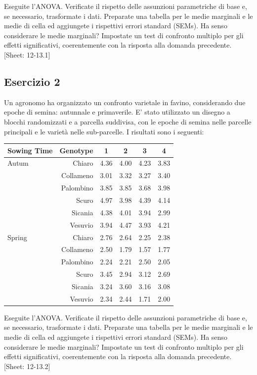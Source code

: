 \documentclass[a4paper,12pt,oneside]{book}
\begin{document}
Eseguite l'ANOVA. Verificate il rispetto delle assunzioni parametriche di base e, se necessario, trasformate i dati. Preparate una tabella per le medie marginali e le medie di cella ed aggiungete i rispettivi errori standard (SEMs). Ha senso considerare le medie marginali? Impostate un test di confronto multiplo per gli effetti significativi, coerentemente con la risposta alla domanda precedente.
{[}Sheet: 12-13.1{]}

\hypertarget{esercizio-2-8}{%
\subsection{Esercizio 2}\label{esercizio-2-8}}

Un agronomo ha organizzato un confronto varietale in favino, considerando due epoche di semina: autunnale e primaverile. E' stato utilizzato un disegno a blocchi randomizzati e a parcella suddivisa, con le epoche di semina nelle parcelle principali e le varietà nelle sub-parcelle. I risultati sono i seguenti:

\begin{longtable}[]{@{}lrcccc@{}}
\toprule
Sowing Time & Genotype & 1 & 2 & 3 & 4 \\
\midrule
\endhead
Autum & Chiaro & 4.36 & 4.00 & 4.23 & 3.83 \\
& Collameno & 3.01 & 3.32 & 3.27 & 3.40 \\
& Palombino & 3.85 & 3.85 & 3.68 & 3.98 \\
& Scuro & 4.97 & 3.98 & 4.39 & 4.14 \\
& Sicania & 4.38 & 4.01 & 3.94 & 2.99 \\
& Vesuvio & 3.94 & 4.47 & 3.93 & 4.21 \\
Spring & Chiaro & 2.76 & 2.64 & 2.25 & 2.38 \\
& Collameno & 2.50 & 1.79 & 1.57 & 1.77 \\
& Palombino & 2.24 & 2.21 & 2.50 & 2.05 \\
& Scuro & 3.45 & 2.94 & 3.12 & 2.69 \\
& Sicania & 3.24 & 3.60 & 3.16 & 3.08 \\
& Vesuvio & 2.34 & 2.44 & 1.71 & 2.00 \\
\bottomrule
\end{longtable}

Eseguite l'ANOVA. Verificate il rispetto delle assunzioni parametriche di base e, se necessario, trasformate i dati. Preparate una tabella per le medie marginali e le medie di cella ed aggiungete i rispettivi errori standard (SEMs). Ha senso considerare le medie marginali? Impostate un test di confronto multiplo per gli effetti significativi, coerentemente con la risposta alla domanda precedente.
{[}Sheet: 12-13.2{]}
\end{document}
